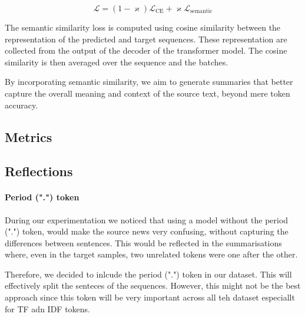 \documentclass[a4papers, 11pt]{article}
\begin{document}
\begin{equation}
    \mathcal{L} = (1 - \varkappa) \mathcal{L}_{\text{CE}} + \varkappa \mathcal{L}_{\text{semantic}}
\end{equation}

The semantic similarity loss is computed using cosine similarity \citep{cosineSimilarity} between the representation of the predicted and target sequences. These representation are collected from the output of the decoder of the transformer model. The cosine similarity is then averaged over the sequence and the batches.

By incorporating semantic similarity, we aim to generate summaries that better capture the overall meaning and context of the source text, beyond mere token accuracy.

\subsection{Metrics}

\subsection{Reflections}
\paragraph{Period (".") token}
During our experimentation we noticed that using a model without the period (".") token, would make the source news very confusing, without capturing the differences between sentences. This would be reflected in the summarisations where, even in the target samples, two unrelated tokens were one after the other.

Therefore, we decided to inlcude the period (".") token in our dataset. This will effectively split the senteces of the sequences. However, this might not be the best approach since this token will be very important across all teh dataset especiallt for TF adn IDF tokens.

\newpage
{}




\newpage
\thispagestyle{empty}
\appendix
\end{document}

